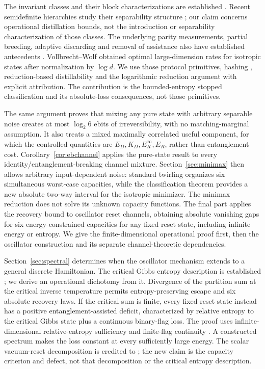 \documentclass[11pt]{article}
\begin{document}
The invariant classes and their block characterizations are established
\cite{jm,sn}. Recent semidefinite hierarchies study their separability
structure \cite{bl}; our claim concerns operational distillation bounds,
not the introduction or separability characterization of those classes.
The underlying parity measurements, partial breeding, adaptive
discarding and removal of assistance also have established antecedents
\cite{hostens,vv,maneva,leung}. Vollbrecht--Wolf
\cite[Section VI.B--C]{vw} obtained optimal large-dimension rates for
isotropic states after normalization by $\log d$. We use those protocol
primitives, hashing \cite{dw}, reduction-based distillability \cite{hh}
and the logarithmic reduction argument \cite{vwentropy} with explicit
attribution. The contribution is the bounded-entropy stopped
classification and its absolute-loss consequences, not those primitives.

The same argument proves that mixing any pure state with arbitrary
separable noise creates at most $\log_2 6$ ebits of irreversibility,
with no matching-marginal assumption. It also treats a mixed maximally
correlated useful component, for which the controlled quantities are
$E_D,K_D,E_R^\infty,E_R$, rather than entanglement cost.
Corollary~\ref{cor:ebchannel} applies the pure-state result to every
identity/entanglement-breaking channel mixture. Section~\ref{sec:minimax}
then allows arbitrary input-dependent noise: standard twirling organizes
six simultaneous worst-case capacities, while the classification theorem
provides a new absolute two-way interval for the isotropic minimizer.
The minimax reduction does not solve its unknown capacity functions.
The final part applies the recovery bound to oscillator reset channels,
obtaining absolute vanishing gaps for six energy-constrained capacities
for any fixed reset state, including infinite energy or entropy.
We give the finite-dimensional operational proof first, then the
oscillator construction and its separate channel-theoretic dependencies.

Section~\ref{sec:spectral} determines when the oscillator mechanism
extends to a general discrete Hamiltonian. The critical Gibbs entropy
description is established \cite[Proposition 1a]{shirokoventropy};
we derive an operational dichotomy from it. Divergence of the partition
sum at the critical inverse temperature permits entropy-preserving
escape and six absolute recovery laws. If the critical sum is finite,
every fixed reset state instead has a positive entanglement-assisted
deficit, characterized by relative entropy to the critical Gibbs state
plus a continuous binary-flag loss. The proof uses infinite-dimensional
relative-entropy sufficiency \cite{jencova} and finite-flag continuity
\cite{shirokovcontinuity}. A constructed spectrum makes the loss
constant at every sufficiently large energy. The scalar vacuum-reset
decomposition is credited to \cite[Appendix C]{catalano}; the new claim
is the capacity criterion and defect, not that decomposition or the
critical entropy description.
\end{document}
